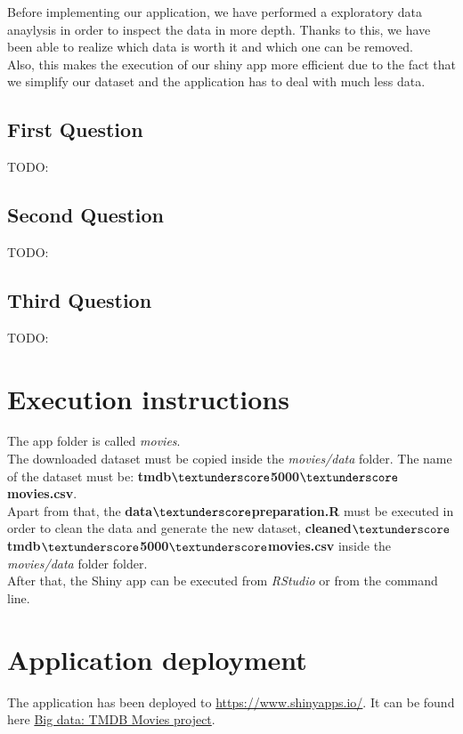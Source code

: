 Before implementing our application, we have performed a exploratory data anaylysis in order to inspect the data in more depth. Thanks to this, we have been able to realize which data is worth it and which one can be removed.\\

Also, this makes the execution of our shiny app more efficient due to the fact that we simplify our dataset and the application has to deal with much less data.\\

\subsection{First Question}
TODO: 

\subsection{Second Question}
TODO:

\subsection{Third Question}
TODO:

\section{Execution instructions}

The app folder is called \textit{movies}.\\

The downloaded dataset must be copied inside the \textit{movies/data} folder. The name of the dataset must be: \textbf{tmdb$\textunderscore$5000$\textunderscore$movies.csv}.\\

Apart from that, the \textbf{data$\textunderscore$preparation.R} must be executed in order to clean the data and generate the new dataset, \textbf{cleaned$\textunderscore$tmdb$\textunderscore$5000$\textunderscore$movies.csv} inside the \textit{movies/data} folder folder.\\

After that, the Shiny app can be executed from \textit{RStudio} or from the command line.

\section{Application deployment}

The application has been deployed to \url{https://www.shinyapps.io/}. It can be found here \href{https://jruedas.shinyapps.io/movies/}{Big data: TMDB Movies project}.

